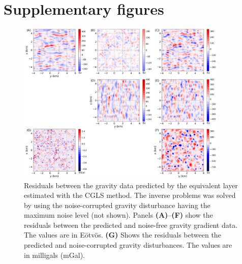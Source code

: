 \documentclass[utf8]{frontiers_suppmat} %
\begin{document}
\section{Supplementary figures}

\begin{figure}[htbp]
	\begin{center}
		\includegraphics[width=10cm]{Fig/CGLS_residuals}
	\end{center}
	\caption{
		Residuals between the gravity data predicted by the equivalent layer estimated with 
		the CGLS method.
		The inverse problems was solved by using the noise-corrupted gravity 
		disturbance having the maximum noise level (not shown).
		Panels \textbf{(A)}--\textbf{(F)} show the residuals between the predicted and 
		noise-free gravity gradient data. The values are in Eötvös.
		\textbf{(G)} Shows the residuals between the predicted and noise-corrupted gravity 
		disturbances. The values are in milligals (mGal).
	}
	\label{fig:residuals-CGLS}
\end{figure}
\end{document}
